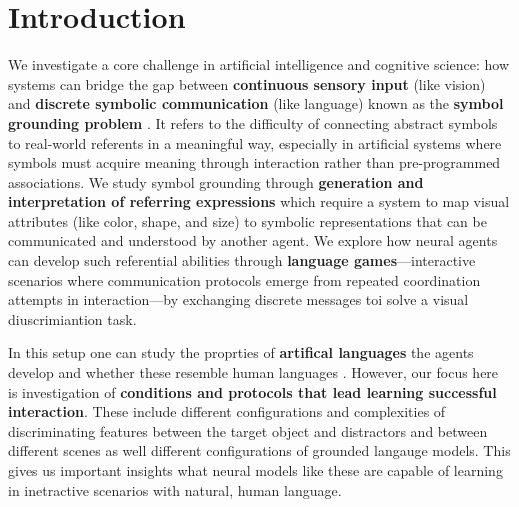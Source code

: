 \documentclass[11pt]{article}
\begin{document}


\section{Introduction} %

We investigate a core challenge in artificial
intelligence and cognitive science: how systems can bridge the gap
between \textbf{continuous sensory input} (like vision) and
\textbf{discrete symbolic communication} (like language) known
as the \textbf{symbol grounding problem} \citep{Harnad1990}. It refers to the difficulty of connecting abstract symbols to
real-world referents in a meaningful way, especially in artificial
systems where symbols must acquire meaning through interaction rather
than pre-programmed associations.
%
We study symbol grounding through \textbf{generation and interpretation of referring expressions} which
require a system to map
visual attributes (like color, shape, and size) to symbolic
representations that can be communicated and understood by another
agent. %
We explore  %
how neural
agents can develop such referential abilities through \textbf{language
games}---interactive scenarios where communication protocols emerge from
repeated coordination attempts in interaction---by exchanging discrete messages toi solve a visual diuscrimiantion task. %

In this setup one can study the proprties of \textbf{artifical
  languages} the agents develop and whether these resemble human
languages \citep{Bartlett2005,Kirby2008,Steels2009,Kharitonov2019,Lazaridou2017}. However, our focus here is investigation of
\textbf{conditions and protocols that lead learning successful
  interaction}. These include different configurations and
complexities of discriminating features between the target object and
distractors and between different scenes as well different
configurations of grounded langauge models. This gives us important
insights what neural models like these are capable of learning in
inetractive scenarios with natural, human language.
\end{document}
